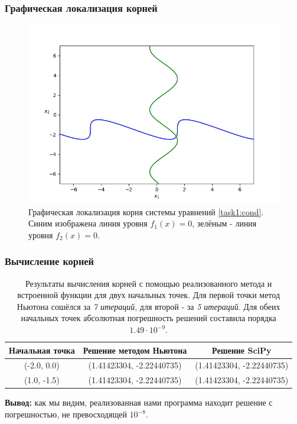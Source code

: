 \documentclass[12pt]{article}%
\begin{document}
\subsubsection{Графическая локализация корней}
\begin{figure}[h]
    \centering
    \includegraphics[width=0.8\linewidth]{roots_loc.png}
    \caption{Графическая локализация корня системы уравнений \ref{task1:cond}. Синим изображена линия уровня $f_1(x) = 0$, зелёным - линия уровня $f_2(x) = 0$.}
\end{figure}
\newpage

\subsubsection{Вычисление корней}
\begin{table}[!h]
    \centering
    \begin{tabular}{|c|c|c|}
    \hline
    Начальная точка & Решение методом Ньютона & Решение SciPy \\
    \hline
    (-2.0, 0.0) & (1.41423304, -2.22440735) & (1.41423304, -2.22440735) \\
    \hline
    (1.0, -1.5) & (1.41423304, -2.22440735) & (1.41423304, -2.22440735) \\
    \hline
    \end{tabular}
    \caption{Результаты вычисления корней с помощью реализованного метода и встроенной функции для двух начальных точек. Для первой точки метод Ньютона сошёлся за \textit{7 итераций}, для второй - за \textit{5 итераций}. Для обеих начальных точек абсолютная погрешность решений составила порядка $1.49 \cdot 10^{-9}$.}
    \label{tab:my_label}
\end{table}

\textbf{Вывод:} как мы видим, реализованная нами программа находит решение с погрешностью, не превосходящей $10^{-8}$.
\end{document}
